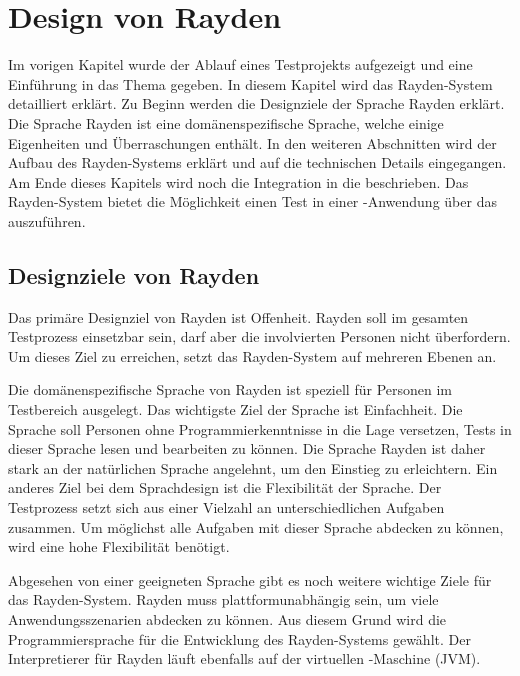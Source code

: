 \chapter{Design von Rayden}
\label{cha:Design}

Im vorigen Kapitel wurde der Ablauf eines Testprojekts aufgezeigt und eine Einführung in das Thema  gegeben. In diesem Kapitel wird das Rayden-System detailliert erklärt. Zu Beginn werden die Designziele der Sprache Rayden erklärt. Die Sprache Rayden ist eine domänenspezifische Sprache, welche einige Eigenheiten und Überraschungen enthält. In den weiteren Abschnitten wird der Aufbau des Rayden-Systems erklärt und auf die technischen Details eingegangen. Am Ende dieses Kapitels wird noch die Integration in die  \cite{JavaScriptApi} beschrieben. Das Rayden-System bietet die Möglichkeit einen Test in einer -Anwendung über das  auszuführen.


\section{Designziele von Rayden}

Das primäre Designziel von Rayden ist Offenheit. Rayden soll im gesamten Testprozess einsetzbar sein, darf aber die involvierten Personen nicht überfordern. Um dieses Ziel zu erreichen, setzt das Rayden-System auf mehreren Ebenen an.

\SuperPar
Die domänenspezifische Sprache von Rayden ist speziell für Personen im Testbereich ausgelegt. Das wichtigste Ziel der Sprache ist Einfachheit. Die Sprache soll Personen ohne Programmierkenntnisse in die Lage versetzen, Tests in dieser Sprache lesen und bearbeiten zu können. Die Sprache Rayden ist daher stark an der natürlichen Sprache angelehnt, um den Einstieg zu erleichtern. Ein anderes Ziel bei dem Sprachdesign ist die Flexibilität der Sprache. Der Testprozess setzt sich aus einer Vielzahl an unterschiedlichen Aufgaben zusammen. Um möglichst alle Aufgaben mit dieser Sprache abdecken zu können, wird eine hohe Flexibilität benötigt. 

\SuperPar
Abgesehen von einer geeigneten Sprache gibt es noch weitere wichtige Ziele für das Rayden-System. Rayden muss plattformunabhängig sein, um viele Anwendungsszenarien abdecken zu können. Aus diesem Grund wird die Programmiersprache  für die Entwicklung des Rayden-Systems gewählt. Der Interpretierer für Rayden läuft ebenfalls auf der virtuellen -Maschine (JVM).

